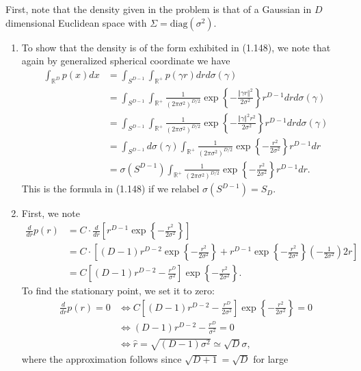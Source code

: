 First, note that the density given in the problem is that of a Gaussian
in $D$ dimensional Euclidean space with $\Sigma=\text{diag}(\sigma^{2}).$ 
\begin{enumerate}[leftmargin={*}]
\item To show that the density is of the form exhibited in (1.148), we
note that again by generalized spherical coordinate we have 
\begin{align*}
\int_{\mathbb{R}^{D}}p(x)dx & =\int_{S^{D-1}}\int_{\mathbb{R}^{+}}p(\gamma r)drd\sigma(\gamma)\\
 & =\int_{S^{D-1}}\int_{\mathbb{R}^{+}}\frac{1}{(2\pi\sigma^{2})^{D/2}}\exp\left\{ -\frac{\left\Vert \gamma r\right\Vert ^{2}}{2\sigma^{2}}\right\} r^{D-1}drd\sigma(\gamma)\\
 & =\int_{S^{D-1}}\int_{\mathbb{R}^{+}}\frac{1}{(2\pi\sigma^{2})^{D/2}}\exp\left\{ -\frac{\left\Vert \gamma\right\Vert ^{2}r^{2}}{2\sigma^{2}}\right\} r^{D-1}drd\sigma(\gamma)\\
 & =\int_{S^{D-1}}d\sigma(\gamma)\int_{\mathbb{R^{+}}}\frac{1}{(2\pi\sigma^{2})^{D/2}}\exp\left\{ -\frac{r^{2}}{2\sigma^{2}}\right\} r^{D-1}dr\\
 & =\sigma(S^{D-1})\int_{\mathbb{R}^{+}}\frac{1}{(2\pi\sigma^{2})^{D/2}}\exp\left\{ -\frac{r^{2}}{2\sigma^{2}}\right\} r^{D-1}dr.
\end{align*}
This is the formula in (1.148) if we relabel $\sigma(S^{D-1})=S_{D}.$ 
\item First, we note 
\begin{align*}
\frac{d}{dr}p(r) & =C\cdot\frac{d}{dr}\left[r^{D-1}\exp\left\{ -\frac{r^{2}}{2\sigma^{2}}\right\} \right]\\
 & =C\cdot\left[(D-1)r^{D-2}\exp\left\{ -\frac{r^{2}}{2\sigma^{2}}\right\} +r^{D-1}\exp\left\{ -\frac{r^{2}}{2\sigma^{2}}\right\} \left(-\frac{1}{2\sigma^{2}}\right)2r\right]\\
 & =C\left[(D-1)r^{D-2}-\frac{r^{D}}{\sigma^{2}}\right]\exp\left\{ -\frac{r^{2}}{2\sigma^{2}}\right\} .
\end{align*}
To find the stationary point, we set it to zero: 
\begin{align*}
\frac{d}{dr}p(r)=0 & \iff C\left[(D-1)r^{D-2}-\frac{r^{D}}{2\sigma^{2}}\right]\exp\left\{ -\frac{r^{2}}{2\sigma^{2}}\right\} =0\\
 & \iff(D-1)r^{D-2}-\frac{r^{D}}{\sigma^{2}}=0\\
 & \iff\hat{r}=\sqrt{(D-1)\sigma^{2}}\simeq\sqrt{D}\sigma,
\end{align*}
where the approximation follows since $\sqrt{D+1}=\sqrt{D}$ for large

\end{enumerate}
